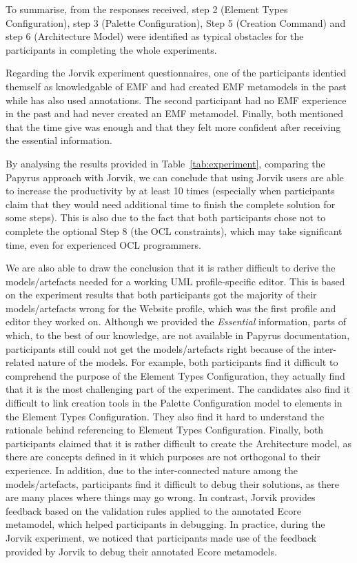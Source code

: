 To summarise, from the responses received, step 2 (Element Types Configuration), step 3 (Palette Configuration), Step 5 (Creation Command) and step 6 (Architecture Model) were identified as typical obstacles for the participants in completing the whole experiments. 

Regarding the Jorvik experiment questionnaires, one of the participants identied themself as knowledgable of EMF and had created EMF metamodels in the past while has also used annotations. The second participant had no EMF experience in the past and had never created an EMF metamodel. Finally, both mentioned that the time give was enough and that they felt more confident after receiving the essential information.

By analysing the results provided in Table~\ref{tab:experiment}, comparing the Papyrus approach with Jorvik, we can conclude that using Jorvik users are able to increase the productivity by at least 10 times (especially when participants claim that they would need additional time to finish the complete solution for some steps). This is also due to the fact that both participants chose not to complete the optional Step 8 (the OCL constraints), which may take significant time, even for experienced OCL programmers.

We are also able to draw the conclusion that it is rather difficult to derive the models/artefacts needed for a working UML profile-specific editor. 
This is based on the experiment results that both participants got the majority of their models/artefacts wrong for the Website profile, which was the first profile and editor they worked on.
Although we provided the \textit{Essential} information, parts of which, to the best of our knowledge, are not available in Papyrus documentation, participants still could not get the models/artefacts right because of the inter-related nature of the models.
For example, both participants find it difficult to comprehend the purpose of the Element Types Configuration, they actually find that it is the most challenging part of the experiment.
The candidates also find it difficult to link creation tools in the Palette Configuration model to elements in the Element Types Configuration. 
They also find it hard to understand the rationale behind referencing to Element Types Configuration.
Finally, both participants claimed that it is rather difficult to create the Architecture model, as there are concepts defined in it which purposes are not orthogonal to their experience.
In addition, due to the inter-connected nature among the models/artefacts, participants find it difficult to debug their solutions, as there are many places where things may go wrong.
In contrast, Jorvik provides feedback based on the validation rules applied to the annotated Ecore metamodel, which helped participants in debugging.
In practice, during the Jorvik experiment, we noticed that participants made use of the feedback provided by Jorvik to debug their annotated Ecore metamodels.

